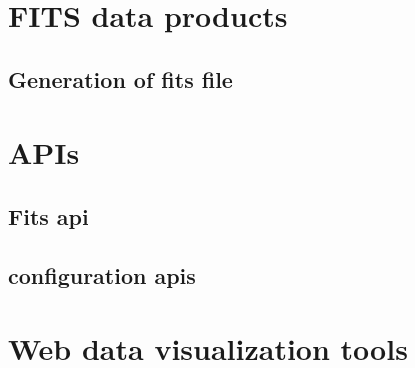 \documentclass[preprint,11pt]{elsarticle}
\begin{document}
\section{FITS data products}
\subsection{Generation of fits file}

\section{ APIs}
\subsection{Fits api}
\subsection{configuration apis}
\section{Web data visualization tools}
\end{document}
